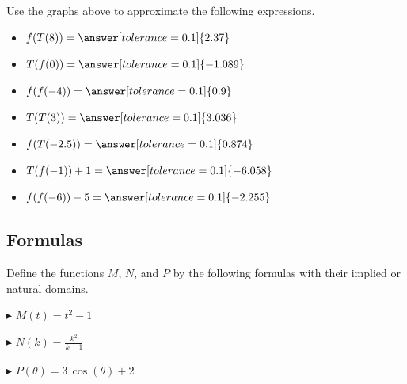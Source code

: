 \documentclass{ximera}
\begin{document}
\begin{question}


Use the graphs above to approximate the following expressions.



\begin{itemize}

\item $f(T(8)) = \answer[tolerance=0.1]{2.37}$ 

\item $T(f(0)) = \answer[tolerance=0.1]{-1.089}$ 

\item $f(f(-4)) = \answer[tolerance=0.1]{0.9}$ 

\item $T(T(3)) = \answer[tolerance=0.1]{3.036}$ 

\item $f(T(-2.5)) = \answer[tolerance=0.1]{0.874}$ 

\item $T(f(-1))+1 = \answer[tolerance=0.1]{-6.058}$ 

\item $f(f(-6)) -5 = \answer[tolerance=0.1]{-2.255}$ 

\end{itemize}



\end{question}

















\subsection*{Formulas}


Define the functions $M$, $N$, and $P$ by the following formulas with their implied or natural domains.

$\blacktriangleright$  $M(t) = t^2 - 1$ 

$\blacktriangleright$ $N(k) = \frac{k^2}{k + 1}$ 

$\blacktriangleright$ $P(\theta) = 3 \, \cos(\theta) + 2$
\end{document}
